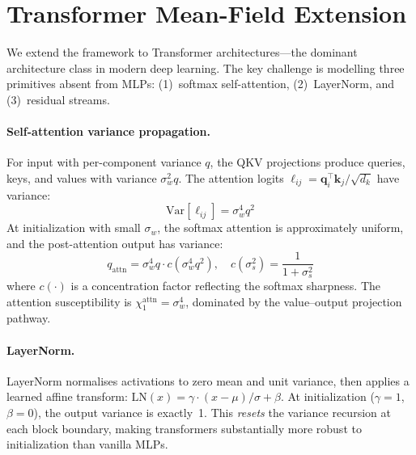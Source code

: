 \documentclass[10pt]{article}
\newcommand{\Var}{\mathrm{Var}}
\begin{document}
\section{Transformer Mean-Field Extension}
\label{sec:transformer}

We extend the framework to Transformer architectures---the dominant architecture class in modern deep learning.
The key challenge is modelling three primitives absent from MLPs: (1)~softmax self-attention, (2)~LayerNorm, and (3)~residual streams.

\paragraph{Self-attention variance propagation.}
For input with per-component variance $q$, the QKV projections produce queries, keys, and values with variance $\sigma_w^2 q$.
The attention logits $\ell_{ij} = \mathbf{q}_i^\top \mathbf{k}_j / \sqrt{d_k}$ have variance:
\begin{equation}
    \Var[\ell_{ij}] = \sigma_w^4 q^2
    \label{eq:attn-logit-var}
\end{equation}
At initialization with small $\sigma_w$, the softmax attention is approximately uniform, and the post-attention output has variance:
\begin{equation}
    q_{\text{attn}} = \sigma_w^4 q \cdot c(\sigma_w^4 q^2), \quad c(\sigma_s^2) = \frac{1}{1 + \sigma_s^2}
    \label{eq:attn-output-var}
\end{equation}
where $c(\cdot)$ is a concentration factor reflecting the softmax sharpness.
The attention susceptibility is $\chi_1^{\text{attn}} = \sigma_w^4$, dominated by the value--output projection pathway.

\paragraph{LayerNorm.}
LayerNorm normalises activations to zero mean and unit variance, then applies a learned affine transform:
$\text{LN}(x) = \gamma \cdot (x - \mu) / \sigma + \beta$.
At initialization ($\gamma = 1$, $\beta = 0$), the output variance is exactly~1.
This \emph{resets} the variance recursion at each block boundary, making transformers substantially more robust to initialization than vanilla MLPs.
\end{document}
